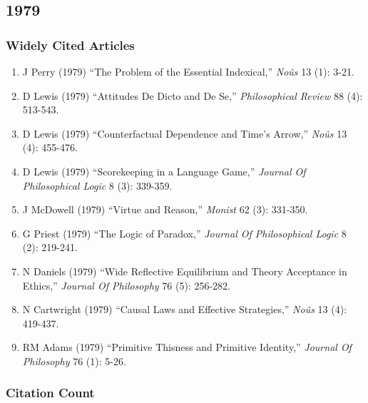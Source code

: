 \documentclass[
  10pt,
  letterpaper,
  DIV=11,
  numbers=noendperiod,
  twoside]{scrartcl}
\providecommand{\tightlist}{%
  \setlength{\itemsep}{0pt}\setlength{\parskip}{0pt}}\usepackage{longtable,booktabs,array}
\begin{document}
\newpage

\subsection{1979}\label{sec-s1979}

\subsubsection*{Widely Cited Articles}\label{widely-cited-articles-23}

\begin{enumerate}
\def\labelenumi{\arabic{enumi}.}
\tightlist
\item
  J Perry (1979) ``The Problem of the Essential Indexical,'' \emph{Noûs}
  13 (1): 3-21.
\item
  D Lewis (1979) ``Attitudes De Dicto and De Se,'' \emph{Philosophical
  Review} 88 (4): 513-543.
\item
  D Lewis (1979) ``Counterfactual Dependence and Time's Arrow,''
  \emph{Noûs} 13 (4): 455-476.
\item
  D Lewis (1979) ``Scorekeeping in a Language Game,'' \emph{Journal Of
  Philosophical Logic} 8 (3): 339-359.
\item
  J McDowell (1979) ``Virtue and Reason,'' \emph{Monist} 62 (3):
  331-350.
\item
  G Priest (1979) ``The Logic of Paradox,'' \emph{Journal Of
  Philosophical Logic} 8 (2): 219-241.
\item
  N Daniels (1979) ``Wide Reflective Equilibrium and Theory Acceptance
  in Ethics,'' \emph{Journal Of Philosophy} 76 (5): 256-282.
\item
  N Cartwright (1979) ``Causal Laws and Effective Strategies,''
  \emph{Noûs} 13 (4): 419-437.
\item
  RM Adams (1979) ``Primitive Thisness and Primitive Identity,''
  \emph{Journal Of Philosophy} 76 (1): 5-26.
\end{enumerate}

\subsubsection*{Citation Count}\label{sec-count-1979}
\end{document}
